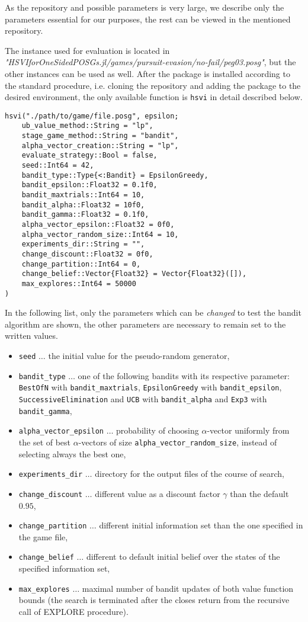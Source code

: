 \documentclass[../main.tex]{subfiles}
\begin{document}
As the repository and possible parameters is very large, we describe only the parameters essential for our purposes, the rest can be viewed in the mentioned repository.

The instance used for evaluation is located in \textit{"HSVIforOneSidedPOSGs.jl/games/pursuit-evasion/no-fail/peg03.posg"}, but the other instances can be used as well.
After the package is installed according to the standard procedure, i.e. cloning the repository and adding the package to the desired environment, the only available function is \texttt{hsvi} in detail described below.
\begin{lstlisting}
hsvi("./path/to/game/file.posg", epsilon;
    ub_value_method::String = "lp",
    stage_game_method::String = "bandit",
    alpha_vector_creation::String = "lp",
    evaluate_strategy::Bool = false,
    seed::Int64 = 42,
    bandit_type::Type{<:Bandit} = EpsilonGreedy,
    bandit_epsilon::Float32 = 0.1f0,
    bandit_maxtrials::Int64 = 10,
    bandit_alpha::Float32 = 10f0,
    bandit_gamma::Float32 = 0.1f0,
    alpha_vector_epsilon::Float32 = 0f0,
    alpha_vector_random_size::Int64 = 10,
    experiments_dir::String = "",
    change_discount::Float32 = 0f0,
    change_partition::Int64 = 0,
    change_belief::Vector{Float32} = Vector{Float32}([]),
    max_explores::Int64 = 50000
) 
\end{lstlisting}
In the following list, only the parameters which can be \textit{changed} to test the bandit algorithm are shown, the other parameters are necessary to remain set to the written values.
\begin{itemize}
    \item \texttt{seed} $\dots$ the initial value for the pseudo-random generator,
    \item \texttt{bandit\_type} $\dots$ one of the following bandits with its respective parameter: \texttt{BestOfN} with \texttt{bandit\_maxtrials}, \texttt{EpsilonGreedy} with \texttt{bandit\_epsilon}, \texttt{SuccessiveElimination} and \texttt{UCB} with \texttt{bandit\_alpha} and \texttt{Exp3} with \texttt{bandit\_gamma},
    \item \texttt{alpha\_vector\_epsilon} $\dots$ probability of choosing $\alpha$-vector uniformly from the set of best $\alpha$-vectors of size \texttt{alpha\_vector\_random\_size}, instead of selecting always the best one,
    \item \texttt{experiments\_dir} $\dots$ directory for the output files of the course of search,
    \item \texttt{change\_discount} $\dots$ different value as a discount factor $\gamma$ than the default $0.95$,
    \item \texttt{change\_partition} $\dots$ different initial information set than the one specified in the game file,
    \item \texttt{change\_belief} $\dots$ different to default initial belief over the states of the specified information set,
    \item \texttt{max\_explores} $\dots$ maximal number of bandit updates of both value function bounds (the search is terminated after the closes return from the recursive call of EXPLORE procedure).
\end{itemize}
\end{document}
